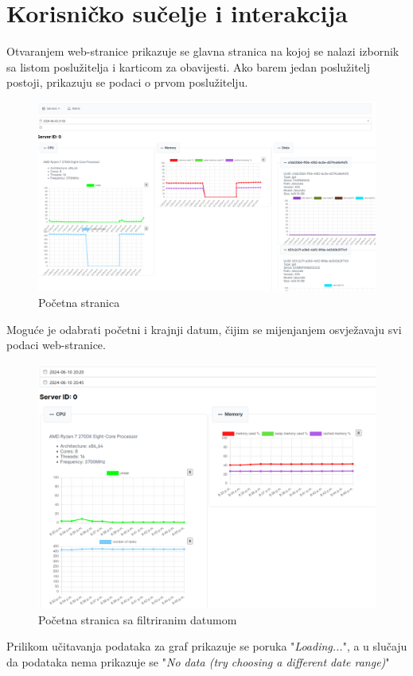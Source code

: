 \documentclass[zavrsnirad]{fer}
\begin{document}
\chapter{Korisničko sučelje i interakcija}
Otvaranjem web-stranice prikazuje se glavna stranica na kojoj se nalazi izbornik sa listom poslužitelja i karticom za obavijesti. Ako barem jedan poslužitelj postoji, prikazuju se podaci o prvom poslužitelju.
\begin{figure}[htb]
	\centering
	\includegraphics[width=1\linewidth]{images/web_1.png}
	\caption{Početna stranica}
\end{figure}
\FloatBarrier

Moguće je odabrati početni i krajnji datum, čijim se mijenjanjem osvježavaju svi podaci web-stranice.
\begin{figure}[htb]
	\centering
	\includegraphics[width=1\linewidth]{images/web_2.png} 
	\caption{Početna stranica sa filtriranim datumom}
\end{figure}
\FloatBarrier
Prilikom učitavanja podataka za graf prikazuje se poruka "\textit{Loading...}", a u slučaju da podataka nema prikazuje se "\textit{No data (try choosing a different date range)}"
\end{document}
